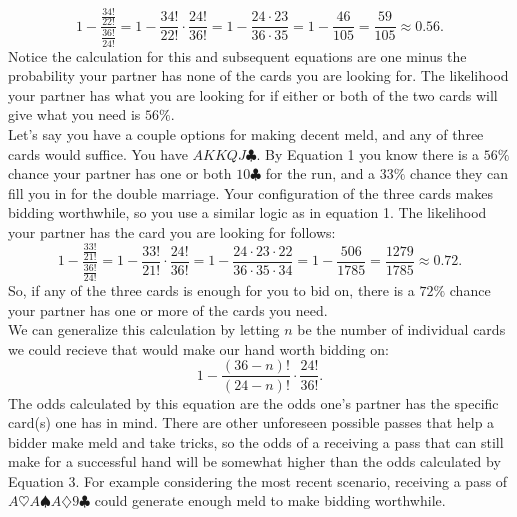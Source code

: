 \documentclass[11pt]{article}
\begin{document}
\begin{equation}
1-\frac{\frac{34!}{22!}}{\frac{36!}{24!}}=1-\frac{34!}{22!}\cdot \frac{24!}{36!}=1-\frac{24\cdot23}{36\cdot35}=1-\frac{46}{105}=\frac{59}{105}\approx 0.56.
\end{equation}
Notice the calculation for this and subsequent equations are one minus the probability your partner has none of the cards you are looking for. The likelihood your partner has what you are looking for if either or both of the two cards will give what you need is $56\%$.\\
\indent Let's say you have a couple options for making decent meld, and any of three cards would suffice. You have $AKKQJ\clubsuit$. By Equation 1 you know there is a $56\%$ chance your partner has one or both $10\clubsuit$ for the run, and a $33\%$ chance they can fill you in for the double marriage. Your configuration of the three cards makes bidding worthwhile, so you use a similar logic as in equation 1. The likelihood your partner has the card you are looking for follows:
\begin{equation}
 1-\frac{\frac{33!}{21!}}{\frac{36!}{24!}}=1-\frac{33!}{21!}\cdot \frac{24!}{36!}=1-\frac{24\cdot 23\cdot 22}{36\cdot 35\cdot 34}=1-\frac{506}{1785}=\frac{1279}{1785}\approx 0.72.
\end{equation}
So, if any of the three cards is enough for you to bid on, there is a $72\%$ chance your partner has one or more of the cards you need.\\
\indent We can generalize this calculation by letting $n$ be the number of individual cards we could recieve that would make our hand worth bidding on:
\begin{equation}
1-\frac{(36-n)!}{(24-n)!}\cdot \frac{24!}{36!}.
\end{equation}
The odds calculated by this equation are the odds one's partner has the specific card(s) one has in mind. There are other unforeseen possible passes that help a bidder make meld and take tricks, so the odds of a receiving a pass that can still make for a successful hand will be somewhat higher than the odds calculated by Equation 3. For example considering the most recent scenario, receiving a pass of $A\heartsuit A\spadesuit A\diamondsuit 9\clubsuit$ could generate enough meld to make bidding worthwhile. \\
\end{document}
